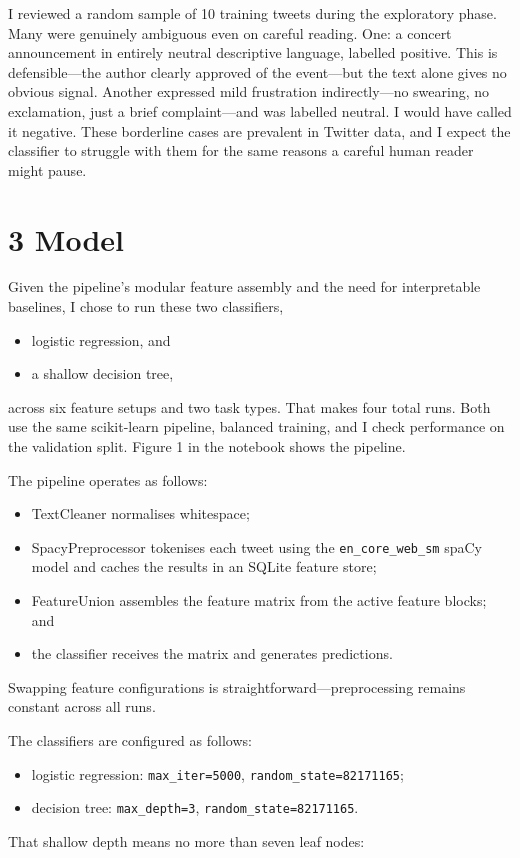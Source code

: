 \documentclass[12pt]{article}
\begin{document}
I reviewed a random sample of 10 training tweets during the exploratory phase. Many were genuinely ambiguous even on careful reading. One: a concert announcement in entirely neutral descriptive language, labelled positive. This is defensible---the author clearly approved of the event---but the text alone gives no obvious signal. Another expressed mild frustration indirectly---no swearing, no exclamation, just a brief complaint---and was labelled neutral. I would have called it negative. These borderline cases are prevalent in Twitter data, and I expect the classifier to struggle with them for the same reasons a careful human reader might pause.



\section*{3 Model}



Given the pipeline's modular feature assembly and the need for interpretable baselines, I chose to run these two classifiers,
\begin{itemize}
  \item logistic regression, and
  \item a shallow decision tree,
\end{itemize}
across six feature setups and two task types. That makes four total runs. Both use the same scikit-learn pipeline, balanced training, and I  check performance on the validation split. Figure 1 in the notebook shows the pipeline.

The pipeline operates as follows:
\begin{itemize}
  \item TextCleaner normalises whitespace;
  \item SpacyPreprocessor tokenises each tweet using the \texttt{en\_core\_web\_sm} spaCy model and caches the results in an SQLite feature store;
  \item FeatureUnion assembles the feature matrix from the active feature blocks; and
  \item the classifier receives the matrix and generates predictions.
\end{itemize}
Swapping feature configurations is straightforward---preprocessing remains constant across all runs.

The classifiers are configured as follows:
\begin{itemize}
  \item logistic regression: \texttt{max\_iter=5000}, \texttt{random\_state=82171165};
  \item decision tree: \texttt{max\_depth=3}, \texttt{random\_state=82171165}.
\end{itemize}
That shallow depth means no more than seven leaf nodes:
\end{document}
